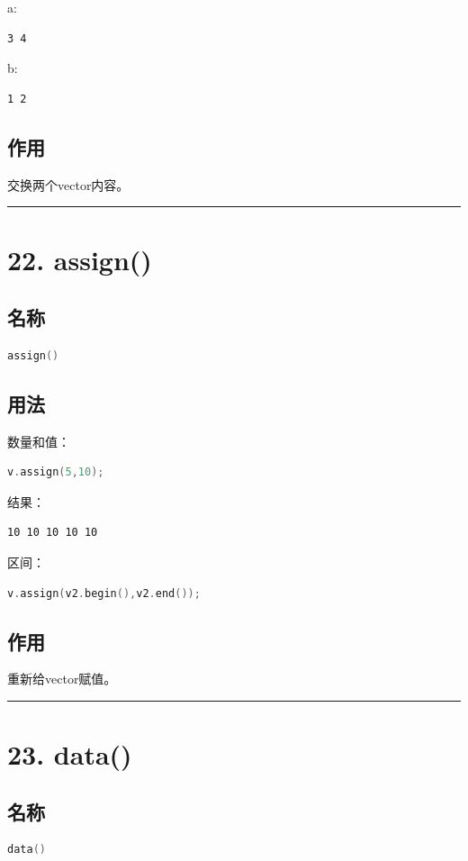\documentclass[9pt,twocolumn]{extarticle}
\begin{document}
a:
\begin{lstlisting}
3 4
\end{lstlisting}
b:
\begin{lstlisting}
1 2
\end{lstlisting}

\subsection{作用}
交换两个vector内容。

\noindent\rule{\linewidth}{0.4pt}

\section{22. assign()}

\subsection{名称}
\begin{lstlisting}[language=C++]
assign()
\end{lstlisting}

\subsection{用法}
数量和值：
\begin{lstlisting}[language=C++]
v.assign(5,10);
\end{lstlisting}
结果：
\begin{lstlisting}
10 10 10 10 10
\end{lstlisting}

区间：
\begin{lstlisting}[language=C++]
v.assign(v2.begin(),v2.end());
\end{lstlisting}

\subsection{作用}
重新给vector赋值。

\noindent\rule{\linewidth}{0.4pt}

\section{23. data()}

\subsection{名称}
\begin{lstlisting}[language=C++]
data()
\end{lstlisting}
\end{document}

